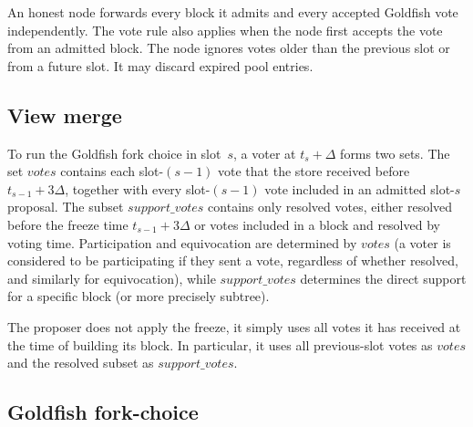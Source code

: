 \documentclass{article}
\theoremstyle{plain}
\theoremstyle{definition}
\theoremstyle{remark}
\begin{document}
An honest node forwards every block it admits and every accepted Goldfish
vote independently.  The vote rule also applies when the node first accepts
the vote from an admitted block.  The node ignores votes older than the
previous slot or from a future slot.  It may discard
expired pool entries.

\subsection{View merge}\label{sec:view-merge}

To run the Goldfish fork choice in slot~$s$, a voter at $t_s+\Delta$ forms
two sets.  The set $\mathit{votes}$ contains each slot-$(s-1)$ vote that the
store received before $t_{s-1}+3\Delta$, together with every slot-$(s-1)$
vote included in an admitted slot-$s$ proposal.  The subset
$\mathit{support\_votes}$ contains only resolved votes, either resolved before the
freeze time $t_{s-1}+3\Delta$ or votes included in a block and resolved by voting time. Participation and equivocation are determined by $\mathit{votes}$ (a voter is considered to be participating if they sent a vote, regardless of whether resolved, and similarly for equivocation), while $\mathit{support\_votes}$ determines the direct support for a specific block (or more precisely subtree).

The proposer does not apply the freeze, it simply uses all votes it has received at the time of building its block. In particular, it uses all previous-slot votes as $\mathit{votes}$ and the resolved subset as
$\mathit{support\_votes}$.

\subsection{Goldfish fork-choice}\label{sec:one-slot-ghost}
\end{document}
